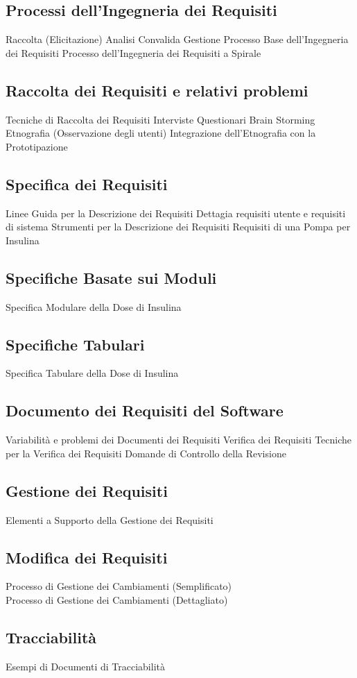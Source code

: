 \documentclass{article}
\begin{document}
	\subsection{Processi dell’Ingegneria dei Requisiti}
	Raccolta (Elicitazione)
	Analisi
	Convalida
	Gestione
	Processo Base dell’Ingegneria dei Requisiti
	Processo dell’Ingegneria dei Requisiti a Spirale
	\subsection{Raccolta dei Requisiti e relativi problemi}
	Tecniche di Raccolta dei Requisiti
	Interviste
	Questionari
	Brain Storming
	Etnografia (Osservazione degli utenti)
	Integrazione dell’Etnografia con la Prototipazione
	\subsection{Specifica dei Requisiti}
	Linee Guida per la Descrizione dei Requisiti
	Dettagia requisiti utente e requisiti di sistema
	Strumenti per la Descrizione dei Requisiti
	Requisiti di una Pompa per Insulina
	\subsection{Specifiche Basate sui Moduli}
	Specifica Modulare della Dose di Insulina
	\subsection{Specifiche Tabulari}
	Specifica Tabulare della Dose di Insulina
	\subsection{Documento dei Requisiti del Software}
	Variabilità e problemi dei Documenti dei Requisiti
	Verifica dei Requisiti
	Tecniche per la Verifica dei Requisiti
	Domande di Controllo della Revisione
	\subsection{Gestione dei Requisiti}
	Elementi a Supporto della Gestione dei Requisiti
	\subsection{Modifica dei Requisiti}
	Processo di Gestione dei Cambiamenti (Semplificato) \\
	Processo di Gestione dei Cambiamenti (Dettagliato)
	\subsection{Tracciabilità}
	Esempi di Documenti di Tracciabilità
	
\end{document}
